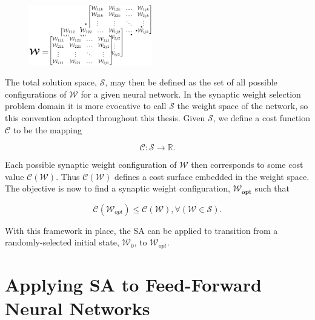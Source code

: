 \documentclass[11pt]{afthesis}
\begin{document}
	 \begin{figure}[ht!]
	 	\begin{center}
	 		\includegraphics[width = 2.1in]{figures/abstract_matrix_rep.eps}
	 		\label{fig:abstract_matrix_rep}
	 	\end{center}
	 \end{figure}
	 
	 \noindent The total solution space, $\boldsymbol{\mathcal{S}}$, may then be defined as the set of all possible configurations of $\boldsymbol{\mathcal{W}}$ for a given neural network. In the synaptic weight selection problem domain it is more evocative to call $\boldsymbol{\mathcal{S}}$ the weight space of the network, so this convention adopted throughout this thesis. Given $\boldsymbol{\mathcal{S}}$, we define a cost function $ \mathcal{C}$ to be the mapping
	 
	 \begin{equation*} \label{eq:cost_mapping_ffnn}
	 \mathcal{C} : \boldsymbol{\mathcal{S}} \rightarrow \mathbb{R}.
	 \end{equation*}
	 
	 
	 Each possible synaptic weight configuration of $\boldsymbol{\mathcal{W}}$ then corresponds to some cost value $\mathcal{C}(\boldsymbol{\mathcal{W}})$. Thus $\mathcal{C}(\boldsymbol{\mathcal{W}})$ defines a cost surface embedded in the weight space. The objective is now to find a synaptic weight configuration, $\boldsymbol{\mathcal{W}_{opt}}$ such that 
	 
	 \begin{equation*} \label{eq:optimal_definition}
	 \mathcal{C}(\boldsymbol{\mathcal{W}}_{opt}) \leq \mathcal{C}\left( \boldsymbol{\mathcal{W}}\right) , \forall\left(  \boldsymbol{\mathcal{W}} \in \boldsymbol{\mathcal{S}}\right) .
	 \end{equation*}
	 
	 \noindent With this framework in place, the SA can be applied to transition from a randomly-selected initial state, $\boldsymbol{\mathcal{W}}_0$, to $\boldsymbol{\mathcal{W}}_{opt}$.
	 

	\section{Applying SA to Feed-Forward Neural Networks}
	
\end{document}
